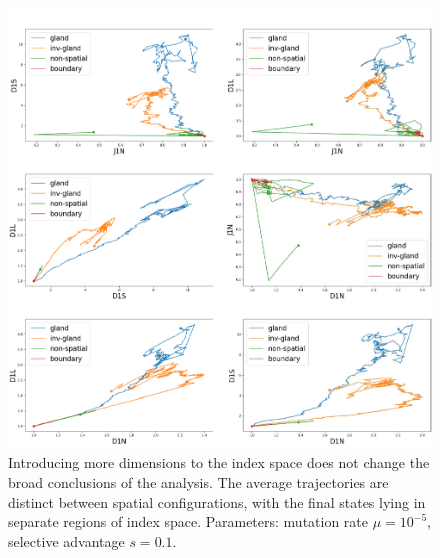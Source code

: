 \begin{figure}[h!]
    \centering
    \includegraphics[width=\textwidth]{Chapter_3/figures/1e0501new.pdf}
    \caption{Introducing more dimensions to the index space does not change the
    broad conclusions of the analysis. The average trajectories are distinct
    between spatial configurations, with the final states lying in separate
    regions of index space. Parameters: mutation rate $\mu = 10^{-5}$,
    selective advantage $s = 0.1$.}
    \label{fig:1e05_01new}
\end{figure}
